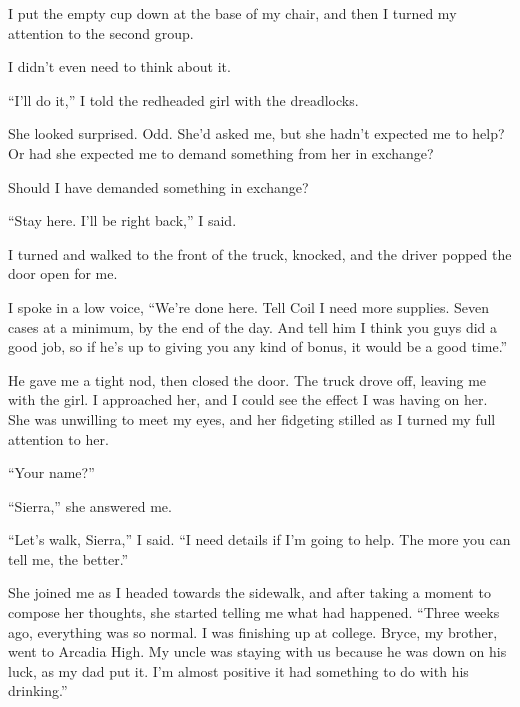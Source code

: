 I put the empty cup down at the base of my chair, and then I turned my attention to the second group.



\blacksquare



I didn't even need to think about it.



``I'll do it,'' I told the redheaded girl with the dreadlocks.



She looked surprised.  Odd.  She'd asked me, but she hadn't expected me to help?  Or had she expected me to demand something from her in exchange?



Should I have demanded something in exchange?



``Stay here.  I'll be right back,'' I said.



I turned and walked to the front of the truck, knocked, and the driver popped the door open for me.



I spoke in a low voice, ``We're done here.  Tell Coil I need more supplies.  Seven cases at a minimum, by the end of the day.  And tell him I think you guys did a good job, so if he's up to giving you any kind of bonus, it would be a good time.''



He gave me a tight nod, then closed the door.  The truck drove off, leaving me with the girl.  I approached her, and I could see the effect I was having on her.  She was unwilling to meet my eyes, and her fidgeting stilled as I turned my full attention to her.



``Your name?''



``Sierra,'' she answered me.



``Let's walk, Sierra,'' I said.  ``I need details if I'm going to help.  The more you can tell me, the better.''



She joined me as I headed towards the sidewalk, and after taking a moment to compose her thoughts, she started telling me what had happened.  ``Three weeks ago, everything was so normal.  I was finishing up at college.  Bryce, my brother, went to Arcadia High.  My uncle was staying with us because he was down on his luck, as my dad put it.  I'm almost positive it had something to do with his drinking.''



